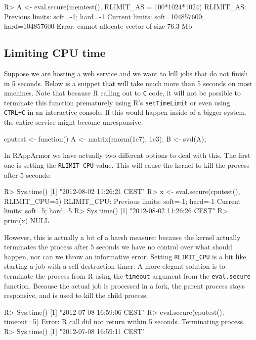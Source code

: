 \documentclass[article]{jss}
\newcommand{\R}{\textsf{R}\xspace}
\begin{document}
\begin{appendices}
\begin{CodeChunk}
\begin{CodeInput}
R> A <- eval.secure(memtest(), RLIMIT_AS = 100*1024*1024)
RLIMIT_AS:
Previous limits: soft=-1; hard=-1
Current limits: soft=104857600; hard=104857600
Error: cannot allocate vector of size 76.3 Mb
\end{CodeInput}
\end{CodeChunk}


\subsection{Limiting CPU time}
\label{cputime}

Suppose we are hosting a web service and we want to kill jobs that do not finish
in 5 seconds. Below is a snippet that will take much more than 5 seconds on most
machines. Note that because \R calling out to \texttt{C} code, it will not be
possible to terminate this function prematurely using R's \texttt{setTimeLimit}
or even using \texttt{CTRL+C} in an interactive console. If this would happen
inside of a bigger system, the entire service might become unresponsive.

\begin{CodeChunk}
\begin{CodeInput}
cputest <- function(){
  A <- matrix(rnorm(1e7), 1e3);
  B <- svd(A);
}
\end{CodeInput}
\end{CodeChunk}
In RAppArmor we have actually two different options to deal with this. The first
one is setting the \texttt{RLIMIT\_CPU} value. This will cause the kernel to
kill the process after 5 seconds:
\begin{CodeChunk}
\begin{CodeInput}
R> Sys.time()
[1] "2012-08-02 11:26:21 CEST"
R> x <- eval.secure(cputest(), RLIMIT_CPU=5)
RLIMIT_CPU:
Previous limits: soft=-1; hard=-1
Current limits: soft=5; hard=5
R> Sys.time()
[1] "2012-08-02 11:26:26 CEST"
R> print(x)
NULL
\end{CodeInput}
\end{CodeChunk}
However, this is actually a bit of a harsh measure: because the kernel actually
terminates the process after 5 seconds we have no control over what should
happen, nor can we throw an informative error. Setting \texttt{RLIMIT\_CPU} is
a bit like starting a job with a self-destruction timer. A more elegant
solution is to terminate the process from \R using the \texttt{timeout}
argument from the \texttt{eval.secure} function. Because the actual job is processed in a fork, the parent process stays responsive, and is used to kill the child process.
\begin{CodeChunk}
\begin{CodeInput}
R> Sys.time()
[1] "2012-07-08 16:59:06 CEST"
R> eval.secure(cputest(), timeout=5)
Error: R call did not return within 5 seconds. Terminating process.
R> Sys.time()
[1] "2012-07-08 16:59:11 CEST"
\end{CodeInput}
\end{CodeChunk}


\end{appendices}
\end{document}

